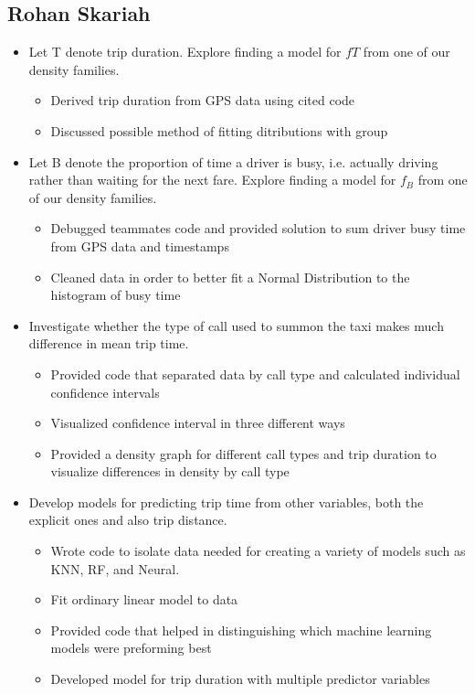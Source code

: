 \documentclass{article}
\numberwithin{equation}{section}
\begin{document}
\subsection{Rohan Skariah}
\begin{itemize}
    \item Let T denote trip duration. Explore finding a model for $fT$ from one of our density families.
    \begin{itemize}
        \item Derived trip duration from GPS data using cited code
        \item Discussed possible method of fitting ditributions with group
    \end{itemize}
    \item Let B denote the proportion of time a driver is busy, i.e. actually driving rather than waiting for the next fare. Explore finding a model for $f_B$ from one of our density families.
    \begin{itemize}
        \item Debugged teammates code and provided solution to sum driver busy time from GPS data and timestamps
        \item Cleaned data in order to better fit a Normal Distribution to the histogram of busy time
    \end{itemize}
    \item Investigate whether the type of call used to summon the taxi makes much difference in mean trip time.
      \begin{itemize}
        \item Provided code that separated data by call type and calculated individual confidence intervals
        \item Visualized confidence interval in three different ways
        \item Provided a density graph for different call types and trip duration to visualize differences in density by call type
    \end{itemize}
    \item Develop models for predicting trip time from other variables, both the explicit ones and also trip distance.
     \begin{itemize}
        \item Wrote code to isolate data needed for creating a variety of models such as KNN, RF, and Neural.
        \item Fit ordinary linear model to data
        \item Provided code that helped in distinguishing which machine learning models were preforming best
        \item Developed model for trip duration with multiple predictor variables
        
    \end{itemize}
    
\end{itemize}
\end{document}
